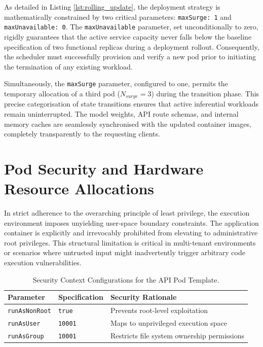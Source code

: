 As detailed in Listing \ref{lst:rolling_update}, the deployment strategy is mathematically constrained by two critical parameters: \texttt{maxSurge: 1} and \texttt{maxUnavailable: 0}. The \texttt{maxUnavailable} parameter, set unconditionally to zero, rigidly guarantees that the active service capacity never falls below the baseline specification of two functional replicas during a deployment rollout. Consequently, the scheduler must successfully provision and verify a new pod prior to initiating the termination of any existing workload.

Simultaneously, the \texttt{maxSurge} parameter, configured to one, permits the temporary allocation of a third pod ($N_{surge} = 3$) during the transition phase. This precise categorisation of state transitions ensures that active inferential workloads remain uninterrupted. The model weights, API route schemas, and internal memory caches are seamlessly synchronised with the updated container images, completely transparently to the requesting clients.

\section{Pod Security and Hardware Resource Allocations}
\label{sec:pod_security_hardware}

In strict adherence to the overarching principle of least privilege, the execution environment imposes unyielding user-space boundary constraints. The application container is explicitly and irrevocably prohibited from elevating to administrative root privileges. This structural limitation is critical in multi-tenant environments or scenarios where untrusted input might inadvertently trigger arbitrary code execution vulnerabilities.

\begin{table}[htbp]
\centering
\caption{Security Context Configurations for the API Pod Template.}
\label{tab:security_context}
\begin{tabular}{@{}lll@{}}
\toprule
\textbf{Parameter} & \textbf{Specification} & \textbf{Security Rationale} \\ \midrule
\texttt{runAsNonRoot} & \texttt{true} & Prevents root-level exploitation \\
\texttt{runAsUser} & \texttt{10001} & Maps to unprivileged execution space \\
\texttt{runAsGroup} & \texttt{10001} & Restricts file system ownership permissions \\ \bottomrule
\end{tabular}
\end{table}

